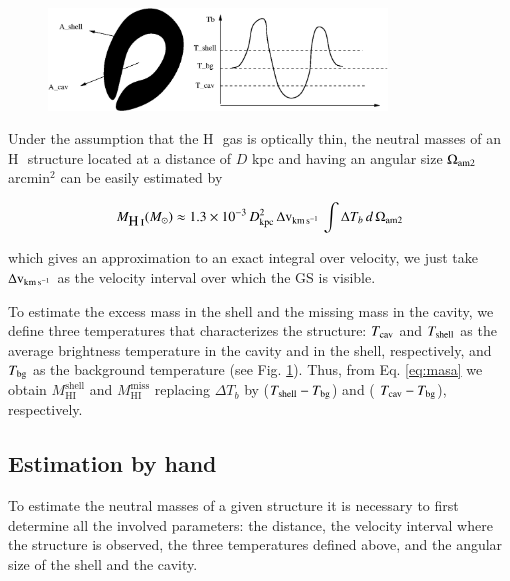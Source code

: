 \documentclass{aa}
\newcommand{\hi}{\mbox{H\,\sc{i}}}
\begin{document}





\begin{figure}
\centering
\includegraphics[width=9cm]{sc.eps}
\caption{}
\label{sc}
\end{figure}

Under the assumption that the \hi\, gas is optically thin, the neutral masses of an \hi\, structure located at a distance of $D$ kpc and  having an   angular size $\Omega_{\rm am2}$ arcmin$^2$ can be easily  estimated by

\begin{equation}
M_{\mbox{H\,\sc{i}}}(M_{\odot}) \approx 1.3 \times 10^{-3}\, D_{\rm kpc}^2\, \Delta {\rm v}_{\rm km\,s^{-1}} \, \int{\Delta T_{b} \, d\,\Omega_{\rm am2}}
\label{eq:masa}
\end{equation}

\noindent which gives an approximation to  an exact integral over velocity,  we just take $\Delta {\rm v}_{\rm km\,s^{-1}}$ as the velocity interval  over which the GS is visible.

To estimate the excess mass in the shell and the missing mass in the cavity, we define three temperatures that characterizes the structure: $T_{\rm cav}$ and $T_{\rm shell}$ as the average brightness temperature in the cavity and in the shell, respectively, and $T_{\rm bg}$ as the background temperature (see Fig. \ref{sc}).
Thus, from Eq. \ref{eq:masa} we obtain $M_{\mathrm{HI}}^{\mathrm{shell}}$ and $M_{\mathrm{HI}}^{\mathrm{miss}}$ replacing $\Delta T_{b}$ by ($T_{\rm shell} - T_{\rm bg}$) and ( $T_{\rm cav} -T_{\rm bg}$), respectively.

\subsection{Estimation by hand}\label{hand}

To estimate the neutral masses of a given structure it is necessary to first determine all the involved parameters: the distance, the velocity interval where the structure is observed, the three temperatures defined above, and the angular size of the shell and the cavity. 
\end{document}
